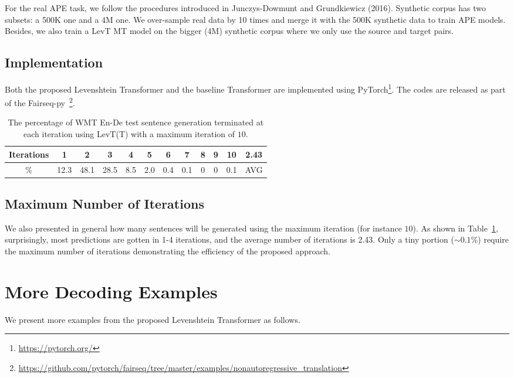 \documentclass{article}
\begin{document}
For the real APE task, we follow the procedures introduced in Junczys-Dowmunt and Grundkiewicz
(2016). Synthetic corpus has two subsets: a 500K one and a 4M one. We over-sample real data by 10
times and merge it with the 500K synthetic data to train APE models. Besides, we also train a LevT
MT model on the bigger (4M) synthetic corpus where we only use the source and target pairs.

\subsection{Implementation}
Both the proposed Levenshtein Transformer and the baseline Transformer are implemented using
PyTorch\footnote{\url{https://pytorch.org/}}. The codes are released as part of the Fairseq-py~\footnote{\url{https://github.com/pytorch/fairseq/tree/master/examples/nonautoregressive_translation}}.

\begin{table}[]
    \centering
    \caption{The percentage of WMT En-De test sentence generation terminated at each iteration using LevT(T) with a maximum iteration of $10$.}
    \begin{tabular}{ccccccccccc|c}
\\\toprule  
Iterations & 1 & 2 &3 &4 &5 &6 &7&8 & 9 &10& 2.43\\\midrule
\% & 12.3 & 48.1 & 28.5 & 8.5 & 2.0 & 0.4 & 0.1 & 0 & 0 & 0.1 & AVG
 \\  \bottomrule
\end{tabular}   
    \label{tab:max_iteration}
\end{table}

\subsection{Maximum Number of Iterations}
We also presented in general how many sentences will be generated using the maximum iteration (for instance $10$). As shown in Table~\ref{tab:max_iteration}, surprisingly, most predictions are gotten in 1-4 iterations, and the average number of iterations is 2.43. Only a tiny portion ($\sim 0.1\%$) require the maximum number of iterations demonstrating the efficiency of the proposed approach.







\newpage
\section{More Decoding Examples}
We present more examples from the proposed Levenshtein Transformer as follows.
\end{document}

